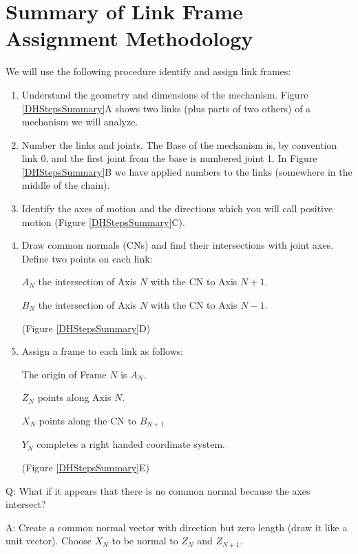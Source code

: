 \section{Summary of Link Frame Assignment Methodology}\label{Steps}
We will use the following procedure identify and assign link frames:
\begin{enumerate}
	\item  Understand the geometry and dimensions of the mechanism. Figure \ref{DHStepsSummary}A shows two links (plus parts of two others) of a mechanism we will analyze.


\item Number the links and joints.   The Base of the mechanism is, by convention link 0, and the first joint from the base is numbered joint 1.   In Figure \ref{DHStepsSummary}B we have applied numbers to the links (somewhere in the middle of the chain).




\item  Identify the axes of motion and the directions which you will call positive motion (Figure \ref{DHStepsSummary}C).




\item Draw common normals (CNs) and find their intersections with joint axes.  Define two points on each link:

$A_N$  the intersection of Axis $N$ with the CN to Axis $N+1$.

$B_N$  the intersection of Axis $N$ with the CN to Axis $N-1$.

(Figure \ref{DHStepsSummary}D)


	\item Assign a frame to each link as follows:

The origin of Frame $N$ is $A_N$.

$Z_N$ points along Axis $N$.

$X_N$ points along the CN to $B_{N+1}$

$Y_N$ completes a right handed coordinate system.

(Figure \ref{DHStepsSummary}E)


\end{enumerate}

\vspace{0.25in}


Q:  What if it appears that there is no common normal because the axes intersect?

A: Create a common normal vector with direction but zero length (draw it like a unit vector).
Choose $X_N$ to be normal to $Z_N$ and $Z_{N+1}$.

